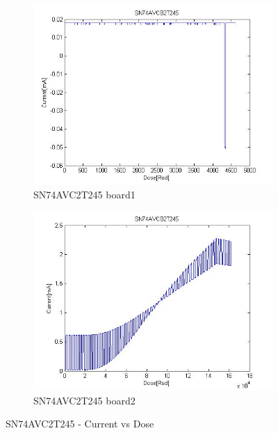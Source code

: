 \documentclass[12pt]{article}
\numberwithin{figure}{section}
\begin{document}
\begin{figure}[!htbp]
\centering
  \begin{subfigure}{.49\textwidth}
  \centering
  \includegraphics[width=\linewidth]{current_t245.jpg}
  \caption{SN74AVC2T245 board1}
  \label{SN74AVC2T245_1}
  \end{subfigure}
  \begin{subfigure}{.49\textwidth}
  \centering
  \includegraphics[width=\linewidth]{current_dose_t2452.jpg}
  \caption{SN74AVC2T245 board2}
  \label{SN74AVC2T245_2}
  \end{subfigure}
 \caption{SN74AVC2T245 - Current vs Dose}
\end{figure}

\FloatBarrier
\end{document}
